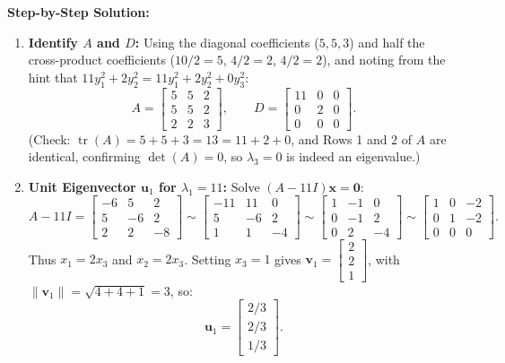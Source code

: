 \documentclass[11pt, letterpaper]{article}
\theoremstyle{definition}
\theoremstyle{remark}
\begin{document}
\textbf{Step-by-Step Solution:}
\begin{enumerate}[leftmargin=2em]
    \item \textbf{Identify $A$ and $D$:}
    Using the diagonal coefficients ($5, 5, 3$) and half the cross-product coefficients ($10/2 = 5$, $4/2 = 2$, $4/2 = 2$), and noting from the hint that $11y_1^2 + 2y_2^2 = 11y_1^2 + 2y_2^2 + 0y_3^2$:
    \[
    A = \begin{bmatrix} 5 & 5 & 2 \\ 5 & 5 & 2 \\ 2 & 2 & 3 \end{bmatrix}, \qquad D = \begin{bmatrix} 11 & 0 & 0 \\ 0 & 2 & 0 \\ 0 & 0 & 0 \end{bmatrix}.
    \]
    (Check: $\operatorname{tr}(A) = 5 + 5 + 3 = 13 = 11 + 2 + 0$, and Rows 1 and 2 of $A$ are identical, confirming $\det(A) = 0$, so $\lambda_3 = 0$ is indeed an eigenvalue.)
    \item \textbf{Unit Eigenvector $\mathbf{u}_1$ for $\lambda_1 = 11$:}
    Solve $(A - 11I)\mathbf{x} = \mathbf{0}$:
    \[
    A - 11I = \begin{bmatrix} -6 & 5 & 2 \\ 5 & -6 & 2 \\ 2 & 2 & -8 \end{bmatrix} \sim \begin{bmatrix} -11 & 11 & 0 \\ 5 & -6 & 2 \\ 1 & 1 & -4 \end{bmatrix} \sim \begin{bmatrix} 1 & -1 & 0 \\ 0 & -1 & 2 \\ 0 & 2 & -4 \end{bmatrix} \sim \begin{bmatrix} 1 & 0 & -2 \\ 0 & 1 & -2 \\ 0 & 0 & 0 \end{bmatrix}.
    \]
    Thus $x_1 = 2x_3$ and $x_2 = 2x_3$. Setting $x_3 = 1$ gives $\mathbf{v}_1 = \begin{bmatrix} 2 \\ 2 \\ 1 \end{bmatrix}$, with $\|\mathbf{v}_1\| = \sqrt{4 + 4 + 1} = 3$, so:
    \[
    \mathbf{u}_1 = \begin{bmatrix} 2/3 \\ 2/3 \\ 1/3 \end{bmatrix}.
\]
\end{enumerate}
\end{document}
